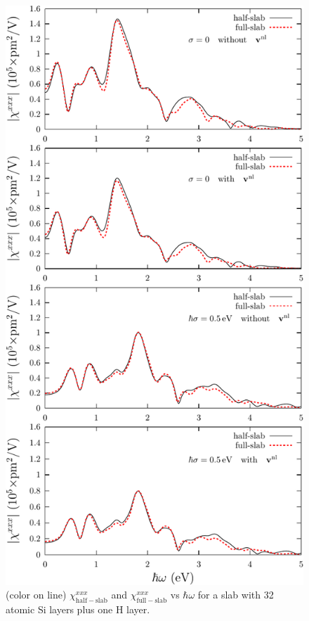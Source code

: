 \documentclass[floatfix,prb,aps,superscriptaddress,11pt,preprint,letterpaper]{revtex4}
\def\chon{red}
\begin{document}
\begin{figure}
\centering 
\includegraphics[scale=.8]{plots/fig2}
\caption{(color on line) 
$\chi^{xxx}_{\mathrm{half-slab}}$
and 
$\chi^{xxx}_{\mathrm{full-slab}}$
vs $\hbar\omega$ for a slab {\color{\chon} with} 32 
atomic Si layers plus one {\color{\chon} H layer}. 
\label{fig2}} 
\end{figure}
\end{document}
